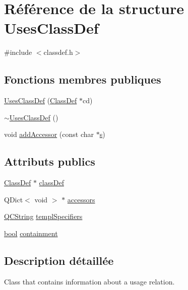 \hypertarget{struct_uses_class_def}{}\section{Référence de la structure Uses\+Class\+Def}
\label{struct_uses_class_def}


{\ttfamily \#include $<$classdef.\+h$>$}

\subsection*{Fonctions membres publiques}
\begin{DoxyCompactItemize}
\item 
\hyperlink{struct_uses_class_def_a315e3fb5ca3523ec88e0ede4d4accafe}{Uses\+Class\+Def} (\hyperlink{class_class_def}{Class\+Def} $\ast$cd)
\item 
\hyperlink{struct_uses_class_def_a6aa317cfd4a4f5312d9a081328b52b5e}{$\sim$\+Uses\+Class\+Def} ()
\item 
void \hyperlink{struct_uses_class_def_acd67c9ac9fa34ad720a18bfab77b828a}{add\+Accessor} (const char $\ast$\hyperlink{060__command__switch_8tcl_a011c73f2dbb87635a3b4206c72355f6e}{s})
\end{DoxyCompactItemize}
\subsection*{Attributs publics}
\begin{DoxyCompactItemize}
\item 
\hyperlink{class_class_def}{Class\+Def} $\ast$ \hyperlink{struct_uses_class_def_ae9ace813f9031b4afb6894e5ad15f901}{class\+Def}
\item 
Q\+Dict$<$ void $>$ $\ast$ \hyperlink{struct_uses_class_def_a41838afce51128c142e9fbb4998aa7c6}{accessors}
\item 
\hyperlink{class_q_c_string}{Q\+C\+String} \hyperlink{struct_uses_class_def_a5f65373ed5c0409ef538193d0e58f06d}{templ\+Specifiers}
\item 
\hyperlink{qglobal_8h_a1062901a7428fdd9c7f180f5e01ea056}{bool} \hyperlink{struct_uses_class_def_a0373cf528ea065d333d13b085cf50b90}{containment}
\end{DoxyCompactItemize}


\subsection{Description détaillée}
Class that contains information about a usage relation. 

